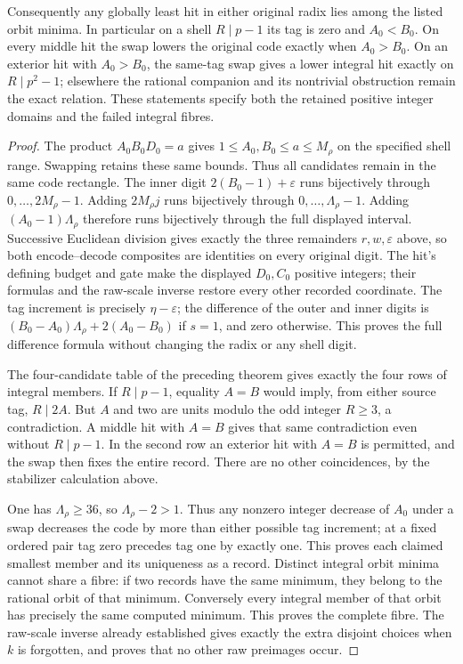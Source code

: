 \begin{theorem}
Consequently any globally least hit in either original radix lies
among the listed orbit minima. In particular on a shell
\(R\mid p-1\) its tag is zero and \(A_0<B_0\).
On every middle hit the swap lowers the original code exactly when
\(A_0>B_0\). On an exterior hit with \(A_0>B_0\), the
same-tag swap gives a lower integral hit exactly on
\(R\mid p^2-1\); elsewhere
the rational companion and its nontrivial obstruction remain the
exact relation. These statements specify both the retained positive
integer domains and the failed integral fibres.
\end{theorem}
\begin{proof}
The product \(A_0B_0D_0=a\) gives
\(1\le A_0,B_0\le a\le M_\rho\) on the specified shell
range. Swapping retains these same bounds. Thus all candidates
remain in the same code rectangle. The inner digit
\(2(B_0-1)+\varepsilon\) runs bijectively through
\(0,\ldots,2M_\rho-1\). Adding \(2M_\rho j\) runs
bijectively through \(0,\ldots,\Lambda_\rho-1\).
Adding \((A_0-1)\Lambda_\rho\) therefore runs bijectively
through the full displayed interval. Successive Euclidean division
gives exactly the three remainders \(r,w,\varepsilon\) above,
so both encode--decode composites are identities on every original
digit. The hit's defining budget and gate make the displayed
\(D_0,C_0\) positive integers; their formulas and the raw-scale
inverse restore every other recorded coordinate.
The tag increment is precisely
\(\eta-\varepsilon\); the difference of the outer and inner
digits is \((B_0-A_0)\Lambda_\rho+2(A_0-B_0)\) if
\(s=1\), and zero otherwise. This proves the full difference
formula without changing the radix or any shell digit.

The four-candidate table of the preceding theorem gives exactly the
four rows of integral members. If \(R\mid p-1\), equality
\(A=B\) would imply, from either source tag, \(R\mid2A\).
But \(A\) and two are units modulo the odd integer \(R\ge3\),
a contradiction. A middle hit with \(A=B\) gives that same
contradiction even without \(R\mid p-1\). In the second row
an exterior hit with \(A=B\) is permitted, and the swap then
fixes the entire record. There are no other coincidences, by the
stabilizer calculation above.

One has \(\Lambda_\rho\ge36\), so
\(\Lambda_\rho-2>1\). Thus any nonzero integer decrease of
\(A_0\) under a swap decreases the code by more than either
possible tag increment; at a fixed ordered pair tag zero precedes
tag one by exactly one. This proves each claimed smallest member
and its uniqueness as a record. Distinct integral orbit minima
cannot share a fibre: if two records have the same minimum, they
belong to the rational orbit of that minimum. Conversely every
integral member of that orbit has precisely the same computed
minimum. This proves the complete fibre. The raw-scale inverse
already established gives exactly the extra disjoint choices when
\(k\) is forgotten, and proves that no other raw preimages occur.


\end{proof}
